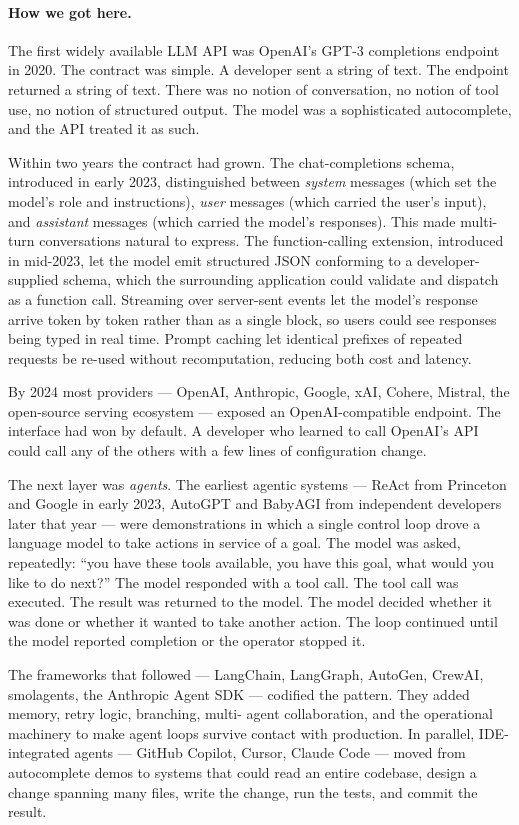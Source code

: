 \paragraph{How we got here.} The first widely available LLM API was OpenAI's GPT-3
completions endpoint in 2020. The contract was simple. A
developer sent a string of text. The endpoint returned a
string of text. There was no notion of conversation, no
notion of tool use, no notion of structured output. The model
was a sophisticated autocomplete, and the API treated it as
such.

Within two years the contract had grown. The chat-completions
schema, introduced in early 2023, distinguished between
\emph{system} messages (which set the model's role and
instructions), \emph{user} messages (which carried the user's
input), and \emph{assistant} messages (which carried the
model's responses). This made multi-turn conversations natural
to express. The function-calling extension, introduced in
mid-2023, let the model emit structured JSON conforming to a
developer-supplied schema, which the surrounding application
could validate and dispatch as a function call. Streaming over
server-sent events let the model's response arrive token by
token rather than as a single block, so users could see
responses being typed in real time. Prompt caching let
identical prefixes of repeated requests be re-used without
recomputation, reducing both cost and latency.

By 2024 most providers --- OpenAI, Anthropic, Google, xAI,
Cohere, Mistral, the open-source serving ecosystem --- exposed
an OpenAI-compatible endpoint. The interface had won by
default. A developer who learned to call OpenAI's API could
call any of the others with a few lines of configuration
change.

The next layer was \emph{agents}. The earliest agentic systems
--- ReAct from Princeton and Google in early 2023, AutoGPT and
BabyAGI from independent developers later that year --- were
demonstrations in which a single control loop drove a language
model to take actions in service of a goal. The model was
asked, repeatedly: ``you have these tools available, you have
this goal, what would you like to do next?'' The model
responded with a tool call. The tool call was executed. The
result was returned to the model. The model decided whether it
was done or whether it wanted to take another action. The
loop continued until the model reported completion or the
operator stopped it.

The frameworks that followed --- LangChain, LangGraph, AutoGen,
CrewAI, smolagents, the Anthropic Agent SDK --- codified the
pattern. They added memory, retry logic, branching, multi-
agent collaboration, and the operational machinery to make
agent loops survive contact with production. In parallel,
IDE-integrated agents --- GitHub Copilot, Cursor, Claude Code
--- moved from autocomplete demos to systems that could read
an entire codebase, design a change spanning many files,
write the change, run the tests, and commit the result.

